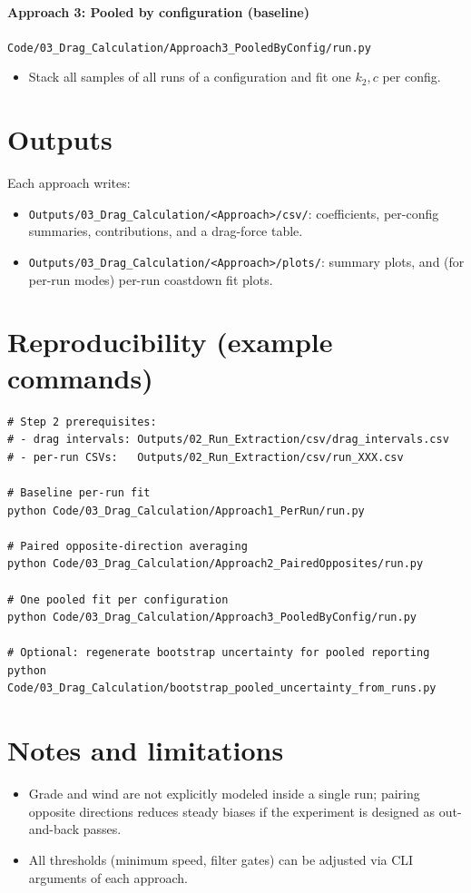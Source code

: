 \documentclass[11pt,a4paper]{article}
\begin{document}
\paragraph{Approach 3: Pooled by configuration (baseline)}
  \texttt{Code/03\_Drag\_Calculation/Approach3\_PooledByConfig/run.py}
\begin{itemize}
  \item Stack all samples of all runs of a configuration and fit one \(k_2,c\) per config.
\end{itemize}

\section{Outputs}
Each approach writes:
\begin{itemize}
  \item \texttt{Outputs/03\_Drag\_Calculation/<Approach>/csv/}:
    coefficients, per-config summaries, contributions, and a drag-force table.
  \item \texttt{Outputs/03\_Drag\_Calculation/<Approach>/plots/}:
    summary plots, and (for per-run modes) per-run coastdown fit plots.
\end{itemize}

\section{Reproducibility (example commands)}
\begin{verbatim}
# Step 2 prerequisites:
# - drag intervals: Outputs/02_Run_Extraction/csv/drag_intervals.csv
# - per-run CSVs:   Outputs/02_Run_Extraction/csv/run_XXX.csv

# Baseline per-run fit
python Code/03_Drag_Calculation/Approach1_PerRun/run.py

# Paired opposite-direction averaging
python Code/03_Drag_Calculation/Approach2_PairedOpposites/run.py

# One pooled fit per configuration
python Code/03_Drag_Calculation/Approach3_PooledByConfig/run.py

# Optional: regenerate bootstrap uncertainty for pooled reporting
python Code/03_Drag_Calculation/bootstrap_pooled_uncertainty_from_runs.py
\end{verbatim}

\section{Notes and limitations}
\begin{itemize}
  \item Grade and wind are not explicitly modeled inside a single run; pairing opposite directions reduces steady biases if the experiment is designed as out-and-back passes.
  \item All thresholds (minimum speed, filter gates) can be adjusted via CLI arguments of each approach.
\end{itemize}
\end{document}
